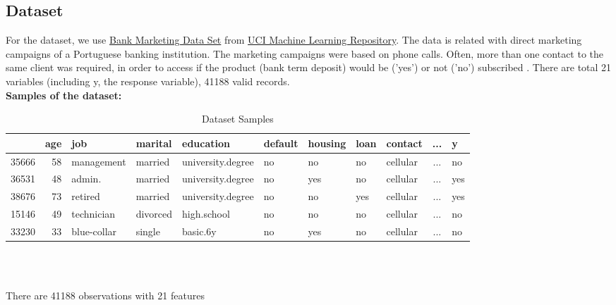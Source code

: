 \documentclass[11pt,a4paper]{article}
\begin{document}
    \subsection{Dataset}
    For the dataset, we use \href{https://archive.ics.uci.edu/ml/datasets/bank+marketing}{Bank Marketing Data Set} from  \href{https://archive.ics.uci.edu/ml/index.php}{UCI Machine Learning Repository}.
    The data is related with direct marketing campaigns of a Portuguese banking institution. The marketing campaigns were based on phone calls. Often, more than one contact to the same client was required, in order to access if the product (bank term deposit) would be ('yes') or not ('no') subscribed \cite{MORO201422}. There are total 21 variables (including y, the response variable), 41188 valid records. \\
    
    \noindent
    \textbf{Samples of the dataset:}
    \begin{table}[ht]
        \centering
        \begin{tabular}{lrlllllllcl}
            {} &  age &          job &   marital &          education & default & housing & loan &   contact & ... & y\\
            
            \hline \hline
            
            35666 &   58 &   management &   married &  university.degree &      no &      no &   no &  cellular & ... & no \\
            36531 &   48 &       admin. &   married &  university.degree &      no &     yes &   no &  cellular & ... & yes \\
            38676 &   73 &      retired &   married &  university.degree &      no &      no &  yes &  cellular & ... & yes \\
            15146 &   49 &   technician &  divorced &        high.school &      no &      no &   no &  cellular & ... & no \\
            33230 &   33 &  blue-collar &    single &           basic.6y &      no &     yes &   no &  cellular & ... & no \\
        \end{tabular} \\ \\
        \caption{Dataset Samples}
        \label{tab:samples}
    \end{table}
    
    \noindent
    There are 41188 observations with 21 features
        
\end{document}
